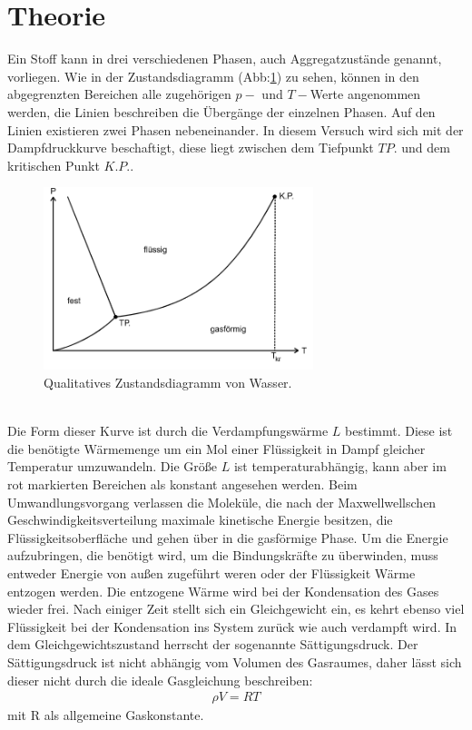 \section{Theorie}
\label{sec:Theorie}

Ein Stoff kann in drei verschiedenen Phasen, auch Aggregatzustände genannt, vorliegen.
Wie in der Zustandsdiagramm (Abb:\ref{fig:zustand}) zu sehen, können in den abgegrenzten
Bereichen alle zugehörigen $p-$ und $T-$Werte angenommen werden, die Linien
beschreiben die Übergänge der einzelnen Phasen. Auf den Linien existieren zwei
Phasen nebeneinander. In diesem Versuch wird sich mit der Dampfdruckkurve beschaftigt, diese
liegt zwischen dem Tiefpunkt $TP.$ und dem kritischen Punkt $K.P.$.
\begin{figure}
 \centering
 \includegraphics[width=0.7\textwidth]{zustand.png}
 \caption{Qualitatives Zustandsdiagramm von Wasser.\cite{sample}}
 \label{fig:zustand}
 \end{figure}\\
 Die Form dieser Kurve ist durch die Verdampfungswärme $L$ bestimmt. Diese ist die benötigte Wärmemenge
 um ein Mol einer Flüssigkeit in Dampf gleicher Temperatur umzuwandeln. Die Größe $L$ ist
 temperaturabhängig, kann aber im rot markierten Bereichen als konstant angesehen werden.
 Beim Umwandlungsvorgang verlassen die Moleküle, die nach der Maxwellwellschen
 Geschwindigkeitsverteilung maximale kinetische Energie besitzen, die Flüssigkeitsoberfläche
 und gehen über in die gasförmige Phase. Um die Energie aufzubringen, die benötigt wird, um
 die Bindungskräfte zu überwinden, muss entweder Energie von außen zugeführt weren oder
 der Flüssigkeit Wärme entzogen werden. Die entzogene Wärme wird bei der Kondensation des
 Gases wieder frei. Nach einiger Zeit stellt sich ein Gleichgewicht ein, es kehrt ebenso
 viel Flüssigkeit bei der Kondensation ins System zurück wie auch verdampft wird.
 In dem Gleichgewichtszustand herrscht der sogenannte Sättigungsdruck.
 Der Sättigungsdruck ist nicht abhängig vom Volumen des Gasraumes, daher lässt sich dieser nicht durch
 die ideale Gasgleichung beschreiben:
 \begin{align}
 \rho V =RT
 \end{align}
 mit R als allgemeine Gaskonstante.
